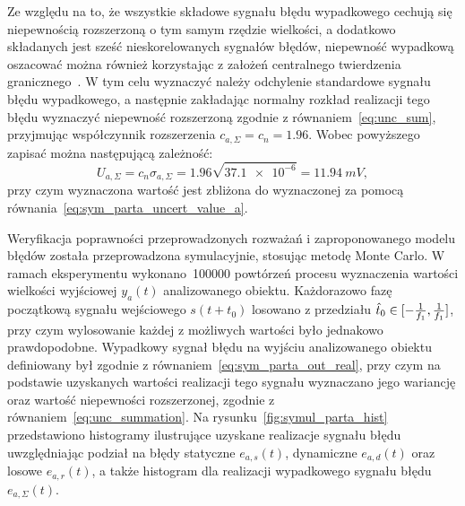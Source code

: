 Ze względu na to, że wszystkie składowe sygnału błędu wypadkowego cechują się niepewnością rozszerzoną o tym samym rzędzie wielkości, a dodatkowo składanych jest sześć nieskorelowanych sygnałów błędów, niepewność wypadkową oszacować można również korzystając z założeń centralnego twierdzenia granicznego~\cite{jcgm_guide}. W tym celu wyznaczyć należy odchylenie standardowe sygnału błędu wypadkowego, a następnie zakładając normalny rozkład realizacji tego błędu wyznaczyć niepewność rozszerzoną zgodnie z równaniem~\eqref{eq:unc_sum}, przyjmując współczynnik rozszerzenia $c_{a,\Sigma} = c_{n} = \num{1.96}$. Wobec powyższego zapisać można następującą zależność:
\begin{equation}
U_{a,\Sigma} = c_{n} \sigma_{a,\Sigma} = \num{1.96} \sqrt{\num{37.1e-6}} = \qty{11.94}{mV} \label{eq:sym_parta_uncert_value_b},
\end{equation}
przy czym wyznaczona wartość jest zbliżona do wyznaczonej za pomocą równania~\eqref{eq:sym_parta_uncert_value_a}.

Weryfikacja poprawności przeprowadzonych rozważań i zaproponowanego modelu błędów została przeprowadzona symulacyjnie, stosując metodę Monte Carlo. W ramach eksperymentu wykonano~\num{100000} powtórzeń procesu wyznaczenia wartości wielkości wyjściowej $y_{a}(t)$ analizowanego obiektu. Każdorazowo fazę początkową sygnału wejściowego $s(t+t_{0})$ losowano z przedziału $\hat{t}_{0} \in \interval{-\frac{1}{f_{1}}}{\frac{1}{f_{1}}}$, przy czym wylosowanie każdej z możliwych wartości było jednakowo prawdopodobne. Wypadkowy sygnał błędu na wyjściu analizowanego obiektu definiowany był zgodnie z równaniem~\eqref{eq:sym_parta_out_real}, przy czym na podstawie uzyskanych wartości realizacji tego sygnału wyznaczano jego wariancję oraz wartość niepewności rozszerzonej, zgodnie z równaniem~\eqref{eq:unc_summation}. Na rysunku~\ref{fig:symul_parta_hist} przedstawiono histogramy ilustrujące uzyskane realizacje sygnału błędu uwzględniając podział na błędy statyczne $e_{a,s}(t)$, dynamiczne $e_{a,d}(t)$ oraz losowe $e_{a,r}(t)$, a także histogram dla realizacji wypadkowego sygnału błędu $e_{a,\Sigma}(t)$.

